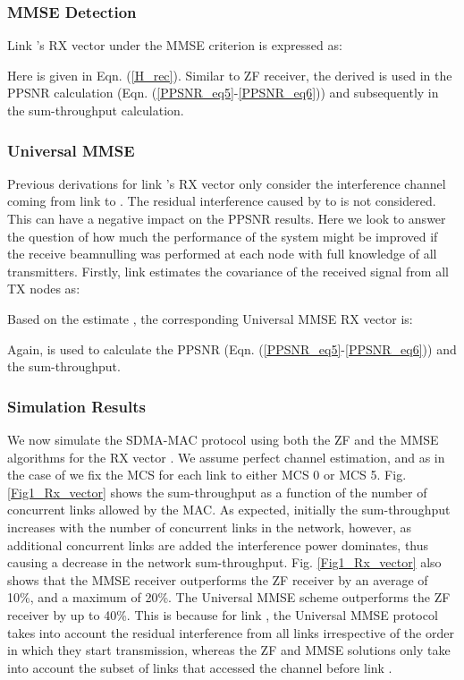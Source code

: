\documentclass[journal, final]{IEEEtran}
\begin{document}
\subsubsection{MMSE Detection}

Link 's RX vector under the MMSE criterion is expressed as:

Here  is given in Eqn. (\ref{H_rec}). Similar to ZF receiver, the derived  is used in the PPSNR calculation (Eqn. (\ref{PPSNR_eq5}-\ref{PPSNR_eq6})) and subsequently in the
sum-throughput calculation.

\subsubsection{Universal MMSE}

Previous derivations for link 's RX vector only consider the
interference channel coming from link  to . The
residual interference caused by  to  is not
considered. This can  have a negative impact on the PPSNR results. Here we look to answer the question of how much the performance of the system might be improved if the receive beamnulling was performed at each node with full knowledge of all  transmitters. Firstly, link  estimates the covariance of the
received signal from all  TX nodes as:

Based on the estimate , the
corresponding Universal MMSE RX vector is:

Again,  is used to calculate the PPSNR (Eqn. (\ref{PPSNR_eq5}-\ref{PPSNR_eq6})) and the
sum-throughput.






\subsubsection{Simulation Results}

We now simulate the SDMA-MAC protocol using both the ZF and the MMSE
algorithms for the RX vector . We assume perfect
channel estimation, and as in the case of \cite{1_SPACEMAC, 2_MIMOMAN, 3_NULLHOC} we fix the MCS for each link
to either MCS 0 or MCS 5. Fig. \ref{Fig1_Rx_vector} shows the sum-throughput as a function of
the number of concurrent links allowed by the MAC. As expected, initially
the sum-throughput increases with the number of concurrent links in the
network, however, as additional concurrent links are added the interference
power dominates, thus causing a decrease in the network sum-throughput.
Fig. \ref{Fig1_Rx_vector} also shows that the MMSE receiver outperforms the ZF receiver by an average of 10{\%}, and a maximum of 20{\%}. The Universal MMSE scheme outperforms the ZF receiver by up to 40{\%}. This is because for link , the Universal MMSE protocol takes into account the residual interference from all links irrespective of the order in which they start transmission, whereas the ZF and MMSE solutions only take into account the subset of links that accessed the channel before link .
\end{document}
